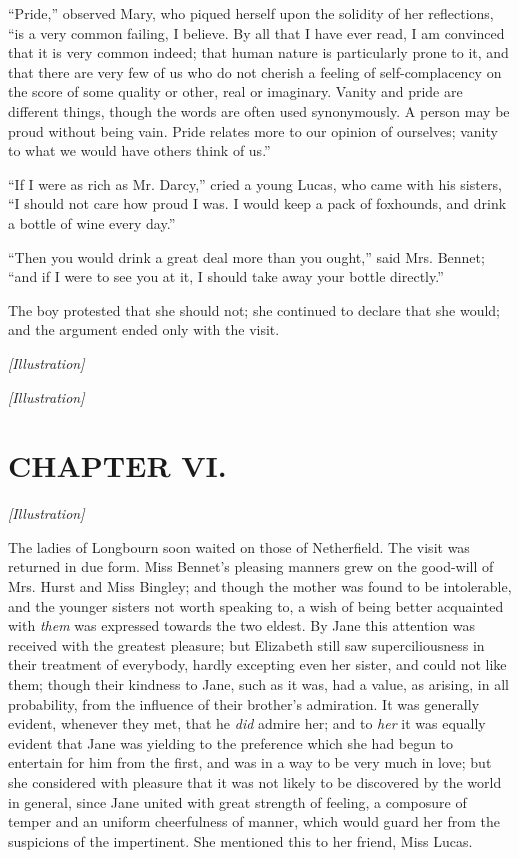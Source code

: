 \documentclass[12pt]{book}
\begin{document}
``Pride,'' observed Mary, who piqued herself upon the solidity of her reflections, ``is a very common failing, I believe. By all that I have ever read, I am convinced that it is very common indeed; that human nature is particularly prone to it, and that there are very few of us who do not cherish a feeling of self-complacency on the score of some quality or other, real or imaginary. Vanity and pride are different things, though the words are often used synonymously. A person may be proud without being vain. Pride relates more to our opinion of ourselves; vanity to what we would have others think of us.''

``If I were as rich as Mr. Darcy,'' cried a young Lucas, who came with his sisters, ``I should not care how proud I was. I would keep a pack of foxhounds, and drink a bottle of wine every day.''

``Then you would drink a great deal more than you ought,'' said Mrs. Bennet; ``and if I were to see you at it, I should take away your bottle directly.''

The boy protested that she should not; she continued to declare that she would; and the argument ended only with the visit.

\emph{[Illustration]}

\emph{[Illustration]}

\chapter{CHAPTER VI.}

\emph{[Illustration]}

The ladies of Longbourn soon waited on those of Netherfield. The visit was returned in due form. Miss Bennet's pleasing manners grew on the good-will of Mrs. Hurst and Miss Bingley; and though the mother was found to be intolerable, and the younger sisters not worth speaking to, a wish of being better acquainted with \textit{them} was expressed towards the two eldest. By Jane this attention was received with the greatest pleasure; but Elizabeth still saw superciliousness in their treatment of everybody, hardly excepting even her sister, and could not like them; though their kindness to Jane, such as it was, had a value, as arising, in all probability, from the influence of their brother's admiration. It was generally evident, whenever they met, that he \textit{did} admire her; and to \textit{her} it was equally evident that Jane was yielding to the preference which she had begun to entertain for him from the first, and was in a way to be very much in love; but she considered with pleasure that it was not likely to be discovered by the world in general, since Jane united with great strength of feeling, a composure of temper and an uniform cheerfulness of manner, which would guard her from the suspicions of the impertinent. She mentioned this to her friend, Miss Lucas.
\end{document}
